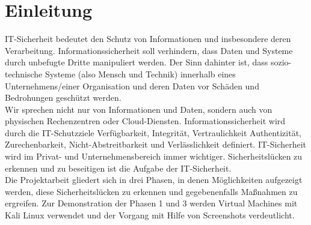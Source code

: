 \chapter*{Einleitung}

IT-Sicherheit bedeutet den Schutz von Informationen und insbesondere deren Verarbeitung. Informationssicherheit soll verhindern, dass Daten und Systeme durch unbefugte Dritte manipuliert werden. Der Sinn dahinter ist, dass sozio-technische Systeme (also Mensch und Technik) innerhalb eines Unternehmens/einer Organisation und deren Daten vor Schäden und Bedrohungen geschützt werden. \\
Wir sprechen nicht nur von Informationen und Daten, sondern auch von physischen Rechenzentren oder Cloud-Diensten. Informationssicherheit wird durch die IT-Schutzziele Verfügbarkeit, Integrität, Vertraulichkeit Authentizität, Zurechenbarkeit, Nicht-Abstreitbarkeit und Verlässlichkeit definiert. IT-Sicherheit wird im Privat- und Unternehmensbereich immer wichtiger. Sicherheitslücken zu erkennen und zu beseitigen ist die Aufgabe der IT-Sicherheit. \\
Die Projektarbeit gliedert sich in drei Phasen, in denen Möglichkeiten aufgezeigt werden, diese Sicherheitslücken zu erkennen und gegebenenfalls Maßnahmen zu ergreifen. Zur Demonstration der Phasen 1 und 3 werden Virtual Machines mit Kali Linux verwendet und der Vorgang mit Hilfe von Screenshots verdeutlicht. 


